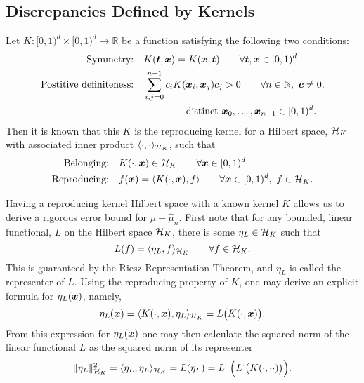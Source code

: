 \documentclass{svproc}
\begin{document}
\subsection{Discrepancies Defined by Kernels} \label{sec:kerdisc}
Let $K: [0,1)^d \times [0,1)^d \to \mathbb{R}$ be a function satisfying the following two conditions:
\begin{subequations} \label{eq:Kcond}
	\begin{align}
		\label{eq:KcondSym}
		\text{Symmetry:} \quad & K({\boldsymbol{t}},{\boldsymbol{x}}) = K({\boldsymbol{x}},{\boldsymbol{t}}) \qquad \forall {\boldsymbol{t}},{\boldsymbol{x}} \in [0,1)^d \\
		\nonumber
		\text{Postitive definiteness:} \quad & \sum_{i,j = 0}^{n-1} c_i K({\boldsymbol{x}}_i,{\boldsymbol{x}}_j) c_j > 0 \qquad  \forall n \in \mathbb{N}, \ {\boldsymbol{c}} \ne 0, \\
		& \qquad \qquad  \ \text{distinct } {\boldsymbol{x}}_0, \ldots, {\boldsymbol{x}}_{n-1} \in [0,1)^d. \label{eq:KcondPD}
	\end{align}
\end{subequations}
Then it is known \cite{Aro50} that this $K$ is the reproducing kernel for a Hilbert space, ${\mathcal{H}}_K$ with associated inner product $\langle \cdot, \cdot \rangle_{{\mathcal{H}}_K}$, such that
\begin{subequations}
	\begin{align}
	\text{Belonging:} \quad & K(\cdot,{\boldsymbol{x}}) \in {\mathcal{H}}_K \qquad \forall {\boldsymbol{x}} \in [0,1)^d \\
	\text{Reproducing:} \quad & f({\boldsymbol{x}}) = \langle K(\cdot,{\boldsymbol{x}}),f \rangle \qquad  \forall {\boldsymbol{x}} \in [0,1)^d, \ f \in {\mathcal{H}}_K.
\end{align}
\end{subequations}

Having a reproducing kernel Hilbert space with a known kernel $K$ allows us to derive a rigorous error bound for $\mu - \hat{\mu}_n$.  First note that for any bounded, linear functional, $L$ on the Hilbert space ${\mathcal{H}}_K$, there is some $\eta_L \in {\mathcal{H}}_K$ such that
\begin{equation*}
L(f) = \langle \eta_L , f \rangle_{{\mathcal{H}}_K} \qquad \forall f \in {\mathcal{H}}_K.
\end{equation*}
This is guaranteed by the Riesz Representation Theorem, and $\eta_L$ is called the representer of $L$.  Using the reproducing property of $K$, one may derive an explicit formula for $\eta_L({\boldsymbol{x}})$, namely,
\begin{equation*}
\eta_L({\boldsymbol{x}}) = \langle K(\cdot, {\boldsymbol{x}}), \eta_L \rangle_{{\mathcal{H}}_K} = L\bigl( K(\cdot,{\boldsymbol{x}}) \bigr).
\end{equation*}
From this expression for $\eta_L({\boldsymbol{x}})$ one may then calculate the squared norm of the linear functional $L$ as the squared norm of its representer
\begin{equation} \label{eq:sqnormL}
	\lVert \eta_L \rVert_{{\mathcal{H}}_K}^2 = \langle\eta_L, \eta_L \rangle_{{\mathcal{H}}_K} = L(\eta_L) = L^{\cdot\cdot} \Bigl(L^{\cdot}\bigl( K(\cdot,\cdot \cdot) \bigr) \Bigr).
\end{equation}
\end{document}
